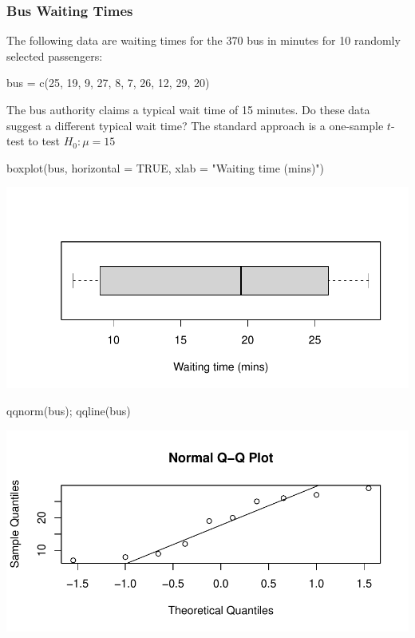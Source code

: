 \documentclass[a4paper]{article}
\begin{document}
\subsubsection{Bus Waiting Times}
The following data are waiting times for the 370 bus in minutes for 10 randomly selected passengers:
\begin{Schunk}
\begin{Sinput}
bus = c(25, 19, 9, 27, 8, 7, 26, 12, 29, 20)
\end{Sinput}
\end{Schunk}
The bus authority claims a typical wait time of 15 minutes. Do these data suggest a different typical wait time?
The standard approach is a one-sample \( t \)-test to test \( H_0: \mu = 15 \)
\begin{Schunk}
\begin{Sinput}
boxplot(bus, horizontal = TRUE, 
    	xlab = "Waiting time (mins)")
\end{Sinput}


{\centering \includegraphics[width=\maxwidth]{figure/listings-unnamed-chunk-111-1} 

}

\begin{Sinput}
qqnorm(bus); qqline(bus)
\end{Sinput}


{\centering \includegraphics[width=\maxwidth]{figure/listings-unnamed-chunk-111-2} 

}

\end{Schunk}
\end{document}
